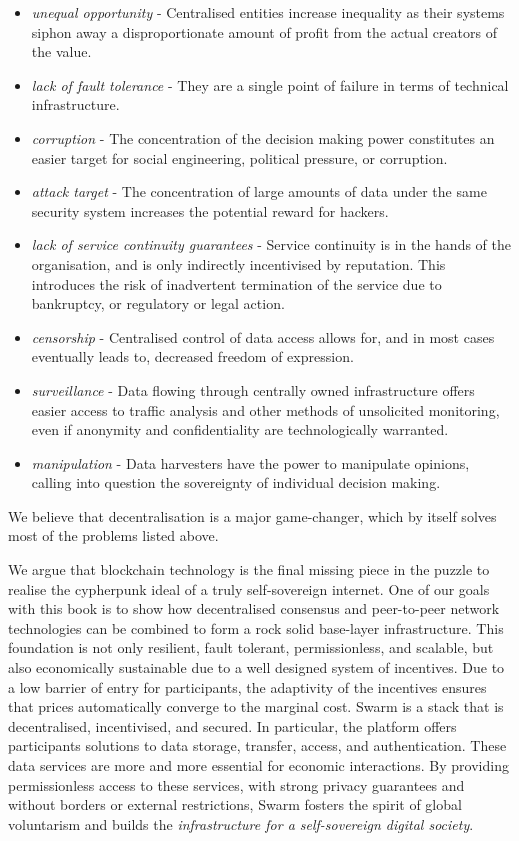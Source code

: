 \begin{itemize}
    \item \emph{unequal opportunity} - Centralised entities increase inequality as their systems siphon away a disproportionate amount of profit from the actual creators of the value.
    \item \emph{lack of fault tolerance} - They are a single point of failure in terms of technical infrastructure.
    \item \emph{corruption} - The concentration of the decision making power constitutes an easier target for social engineering, political pressure, or corruption.
    \item \emph{attack target} - The concentration of large amounts of data under the same security system increases the potential reward for hackers. 
    \item \emph{lack of service continuity guarantees} - Service continuity is in the hands of the organisation, and is only indirectly incentivised by reputation. This introduces the risk of inadvertent termination of the service due to bankruptcy, or regulatory or legal action.
    \item \emph{censorship} - Centralised control of data access allows for, and in most cases eventually leads to, decreased freedom of expression.
    \item \emph{surveillance} - Data flowing through centrally owned infrastructure offers easier access to traffic analysis and other methods of unsolicited monitoring, even if anonymity and confidentiality are technologically warranted.
    \item \emph{manipulation} - Data harvesters have the power to manipulate opinions, calling into question the sovereignty of individual decision making.
\end{itemize}

We believe that decentralisation is a major game-changer, which by itself solves most of the problems listed above.

We argue that blockchain technology is the final missing piece in the puzzle to realise the cypherpunk ideal of a truly self-sovereign internet. One of our goals with this book is to show how decentralised consensus and peer-to-peer network technologies can be combined to form a rock solid base-layer infrastructure. This foundation is not only resilient, fault tolerant, permissionless, and scalable, but also economically sustainable due to a well designed system of incentives. Due to a low barrier of entry for participants, the adaptivity of the incentives ensures that prices automatically converge to the marginal cost.
Swarm is a  stack that is decentralised, incentivised, and secured. In particular, the platform offers participants solutions to data storage, transfer, access, and authentication. These data services are more and more essential for economic interactions. By providing permissionless access to these services, with strong privacy guarantees and without borders or external restrictions, Swarm fosters the spirit of global voluntarism and builds the \emph{infrastructure for a self-sovereign digital society}.

